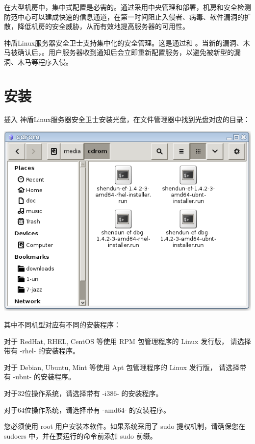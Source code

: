 \documentclass[CJK, 12pt, hyperref, bookmark]{z-article}
\newcommand\sdef{神盾Linux服务器安全卫士}
\newcommand\sdcom{海宁神盾网络信息技术有限公司}
\begin{document}
    在大型机房中，集中式配置是必需的。通过采用中央管理和部署，机房和安全检测防范中心可以建成快速的信息通道，在第一时间阻止入侵者、病毒、软件漏洞的扩散，降低机房的安全威胁，从而有效地提高服务器的可用性。

    \sdef 支持集中化的安全管理。这是通过和 。当新的漏洞、木马被确认后，。用户服务器收到通知后会立即重新配置服务，以避免被新型的漏洞、木马等程序入侵。
    
\section {安装}

    插入 \sdef 安装光盘，在文件管理器中找到光盘对应的目录：
    
    \begin{center}
        \includegraphics[scale=0.5]{filebrow.png}
    \end{center}
    
    其中不同机型对应有不同的安装程序：
    
    对于 RedHat, RHEL, CentOS 等使用 RPM 包管理程序的 Linux 发行版，
    请选择带有 -rhel- 的安装程序。
    
    对于 Debian, Ubuntu, Mint 等使用 Apt 包管理程序的 Linux 发行版，
    请选择带有 -ubnt- 的安装程序。
    
    对于32位操作系统，请选择带有 -i386- 的安装程序。
    
    对于64位操作系统，请选择带有 -amd64- 的安装程序。
    
    您必须使用 root 用户安装本软件。如果系统采用了 sudo 提权机制，请确保您在 sudoers 中，并在要运行的命令前添加 sudo 前缀。
    
\end{document}
